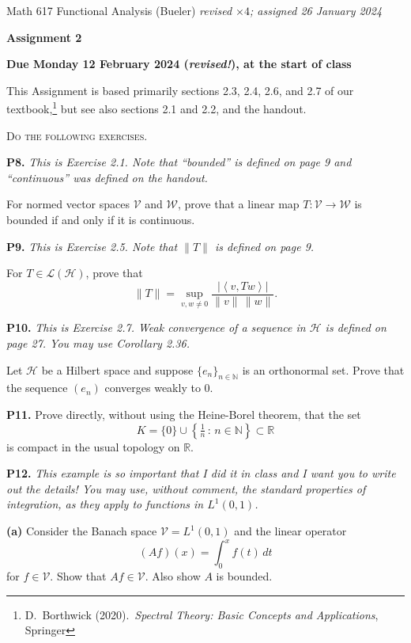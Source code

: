 \documentclass[12pt]{amsart}
\newcommand{\cH}{\mathcal{H}}
\newcommand{\cL}{\mathcal{L}}
\newcommand{\cV}{\mathcal{V}}
\newcommand{\cW}{\mathcal{W}}
\newcommand{\NN}{\mathbb{N}}
\newcommand{\RR}{\mathbb{R}}
\newcommand{\ip}[2]{\ensuremath{\left<#1,#2\right>}}
\newcommand{\prob}[1]{\bigskip\noindent\textbf{#1.}\quad }
\newcommand{\epart}[1]{\medskip\noindent\textbf{(#1)}\quad }
\newcommand{\nex}{\medskip\noindent}
\begin{document}
\scriptsize \noindent Math 617 Functional Analysis (Bueler) \hfill \emph{revised $\times 4$; assigned 26 January 2024}
\normalsize\medskip

\Large\centerline{\textbf{Assignment 2}}
\large
\medskip

\centerline{\textbf{Due Monday 12 February 2024 (\emph{revised!}), at the start of class}}
\medskip
\normalsize

\thispagestyle{empty}

\bigskip
\noindent This Assignment is based primarily sections 2.3, 2.4, 2.6, and 2.7 of our textbook,\footnote{D.~Borthwick (2020).~\emph{Spectral Theory: Basic Concepts and Applications}, Springer} but see also sections 2.1 and 2.2, and the handout.

\medskip
\noindent \textsc{Do the following exercises.}
\smallskip

\prob{P8}  \emph{This is Exercise 2.1.  Note that ``bounded'' is defined on page 9 and ``continuous'' was defined on the handout.}

\nex For normed vector spaces $\cV$ and $\cW$, prove that a linear map $T:\cV\to\cW$ is bounded if and only if it is continuous.


\prob{P9}  \emph{This is Exercise 2.5.  Note that $\|T\|$ is defined on page 9.}

\nex For $T\in\cL(\cH)$, prove that
	$$\|T\| = \sup_{v,w\ne 0} \frac{|\ip{v}{Tw}|}{\|v\|\,\|w\|}.$$


\prob{P10}  \emph{This is Exercise 2.7.  Weak convergence of a sequence in $\cH$ is defined on page 27.  You may use Corollary 2.36.}

\nex Let $\cH$ be a Hilbert space and suppose $\{e_n\}_{n\in\NN}$ is an orthonormal set.  Prove that the sequence $(e_n)$ converges weakly to 0. 


\prob{P11}  Prove directly, without using the Heine-Borel theorem, that the set
	$$K = \{0\} \cup \left\{\tfrac{1}{n}\,:\,n \in \NN\right\} \subset \RR$$
is compact in the usual topology on $\RR$.


\clearpage \newpage
\prob{P12}  \emph{This example is so important that I did it in class \emph{and} I want you to write out the details!  You may use, without comment, the standard properties of integration, as they apply to functions in $L^1(0,1)$.}

\epart{a}  Consider the Banach space $\cV = L^1(0,1)$ and the linear operator
	$$(Af)(x) = \int_0^x f(t)\,dt$$
for $f\in\cV$.  Show that $Af \in \cV$.  Also show $A$ is bounded.
\end{document}
